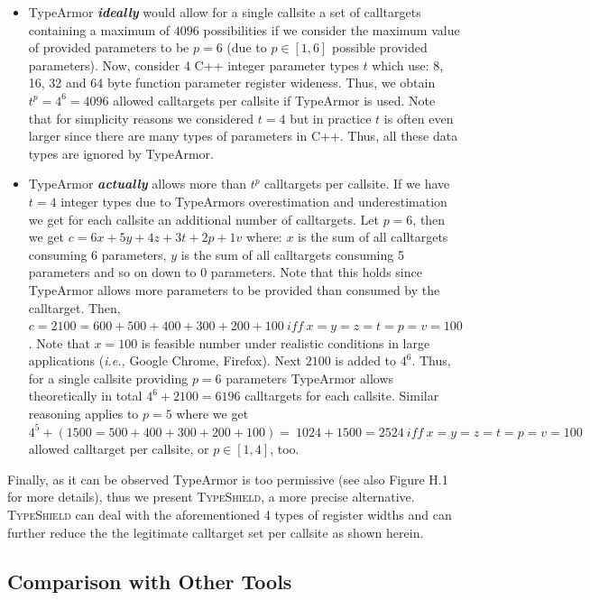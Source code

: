 \begin{itemize}
\item TypeArmor \textbf{\textit{ideally}} would allow for a single callsite a set of calltargets containing a maximum of $4096$ possibilities if we 
consider the maximum value of provided parameters to be $p=6$ (due to $p \in [1, 6]$ possible provided parameters). Now, consider 4 C++ integer parameter
types $t$ which use: 8, 16, 32 and 64 byte function parameter register wideness. Thus, we obtain $t^{p}=4^{6}=4096$ allowed calltargets per 
callsite if TypeArmor is used. Note that for simplicity reasons we considered $t=4$ but in practice $t$ is often even larger since there are many types
of parameters in C++. Thus, all these data types are ignored by TypeArmor.

\item TypeArmor \textbf{\textit{actually}} allows more than $t^{p}$ calltargets per callsite. If we have $t=4$ integer types due to TypeArmors overestimation
and underestimation we get for each callsite an additional number of calltargets. Let $p=6$, then we get $c = 6x + 5y+ 4z + 3t + 2p + 1v$ where:
$x$ is the sum of all calltargets consuming 6 parameters, 
$y$ is the sum of all calltargets consuming 5 parameters 
and so on down to 0 parameters. Note that this holds since TypeArmor allows more parameters to be provided than consumed by the calltarget.
Then, $c = 2100 = 600 + 500 + 400 + 300 + 200 + 100 \ iff \ x = y = z = t = p = v = 100$. 
Note that $x = 100$ is feasible number under realistic conditions in large applications (\textit{i.e.,} Google Chrome, Firefox). 
Next $2100$ is added to $4^{6}$. Thus, for a single callsite providing $p=6$ parameters TypeArmor allows theoretically in 
total $4^{6} + 2100 = 6196$ calltargets for each callsite.
Similar reasoning applies to $p=5$ where we get $4^{5} + (1500 = 500 + 400 + 300 + 200 + 100) = \ 1024 + 1500 = 2524 \ iff \ x=y=z=t=p=v=100$ 
allowed calltarget per callsite, or $p \in [1, 4]$, too.
\end{itemize}

Finally, as it can be observed TypeArmor is too permissive (see also Figure H.1~\cite{vci:asiaccs} for more details), thus 
we present \textsc{TypeShield}, a more precise alternative. \textsc{TypeShield} can deal with the aforementioned 4 types of register widths and can further reduce the the legitimate
calltarget set per callsite as shown herein.

\subsection{Comparison with Other Tools}
\label{RQ5: Is TypeShield better than other tools?}

